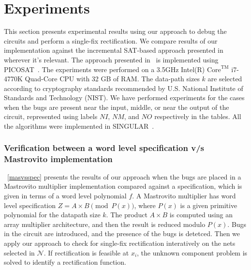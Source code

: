 \section{Experiments}
\label{sec:exp}

This section presents experimental results using our approach to debug
the circuits and perform a single-fix rectification. 
We compare results of our implementation against the incremental SAT-based approach presented in~\cite{fujita:2015} wherever it's relevant.
The approach presented in~\cite{fujita:2015} is implemented using PICOSAT~\cite{picosat}. The experiments were performed on a 3.5GHz 
Intel(R) $\text{Core}^{\text{TM}}$ i7-4770K Quad-Core CPU with 32 GB of RAM. The data-path sizes {$k$} are selected according to cryptography standards recommended by U.S. National Institute of Standards and Technology (NIST). 
We have performed experiments for the cases when the bugs  are present near 
the input, middle, or near the output of the circuit, represented
using labels $NI$, $NM$, and $NO$ respectively in the tables. All the algorithms
were implemented in SINGULAR~\cite{DGPS}. 


\subsubsection{Verification between a word level specification v/s Mastrovito implementation}
~\autoref{masvsspec} presents the results of our approach when the bugs are placed
in a Mastrovito multiplier implementation compared against a specification, which is given in terms of a word level polynomial $f$. 
A Mastrovito multiplier has word level specification $Z = A\times B \pmod{ P(x)}$, 
where $P(x)$ is a given primitive polynomial for the datapath size $k$. The product $A \times B$ 
is computed using an array multiplier architecture, and then the result is reduced modulo $P(x)$. 
Bugs in the circuit are introduced, and the presence of the bugs is
detetced. Then we apply our approach to check for single-fix
rectification interatively on the nets selected in $\mathcal{N}$. If
rectification is feasible at $x_i$, the unknown component problem is
solved to identify a rectification function. 

